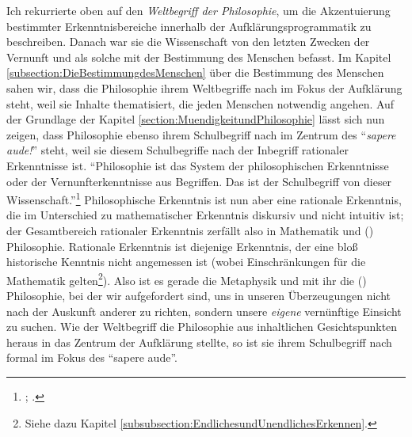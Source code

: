Ich rekurrierte oben auf den \emph{Weltbegriff der Philosophie}, um die
Akzentuierung bestimmter Erkenntnisbereiche innerhalb der
Aufklärungsprogrammatik zu beschreiben. Danach war sie die Wissenschaft von den
letzten Zwecken der Vernunft und als solche mit der Bestimmung des Menschen
befasst. Im Kapitel \ref{subsection:DieBestimmungdesMenschen} über die
Bestimmung des Menschen sahen wir, dass die Philosophie ihrem Weltbegriffe nach
im Fokus der Aufklärung steht, weil sie Inhalte thematisiert, die jeden Menschen
notwendig angehen. Auf der Grundlage der Kapitel
\ref{section:MuendigkeitundPhilosophie} lässt sich nun zeigen, dass
Philosophie ebenso ihrem Schulbegriff nach im Zentrum des \enquote{\emph{sapere
aude!}} steht, weil sie diesem Schulbegriffe nach der Inbegriff rationaler
Erkenntnisse ist. \enquote{Philosophie ist {\punkt} das System der
philosophischen Erkenntnisse oder der Vernunfterkenntnisse aus Begriffen. Das
ist der Schulbegriff von dieser Wissenschaft.}\footnote{\cite[][A
23]{Kant:ImmanuelKantsLogik1977}; \cite[][IX:
23.30--32]{Kant:GesammelteWerke1900ff.}.} Philosophische Erkenntnis ist nun aber
eine rationale Erkenntnis, die im Unterschied zu mathematischer Erkenntnis
diskursiv und nicht intuitiv ist; der Gesamtbereich rationaler Erkenntnis
zerfällt also in Mathematik und () Philosophie. Rationale
Erkenntnis ist diejenige Erkenntnis, der eine bloß historische Kenntnis nicht
angemessen ist (wobei Einschränkungen für die Mathematik
gelten\footnote{Siehe dazu Kapitel
\ref{subsubsection:EndlichesundUnendlichesErkennen}.}).
Also ist es gerade die Metaphysik und mit ihr die ()
Philosophie, bei der wir aufgefordert sind, uns in unseren Überzeugungen nicht
nach der Auskunft anderer zu richten, sondern unsere \emph{eigene} vernünftige
Einsicht zu suchen. Wie der Weltbegriff die
Philosophie aus inhaltlichen Gesichtspunkten heraus in das Zentrum der
Aufklärung stellte, so ist sie ihrem Schulbegriff nach formal im Fokus des \enquote{sapere aude}.

